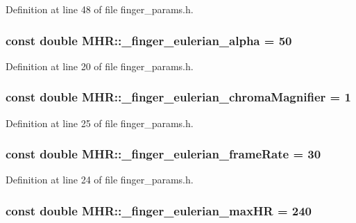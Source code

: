 Definition at line 48 of file finger\+\_\+params.\+h.

\hypertarget{namespace_m_h_r_abe389732cdfc0aa8ebf51a84c4e645a4}{
\subsubsection[{\+\_\+finger\+\_\+eulerian\+\_\+alpha}]{\setlength{\rightskip}{0pt plus 5cm}const double M\+H\+R\+::\+\_\+finger\+\_\+eulerian\+\_\+alpha = 50}}\label{namespace_m_h_r_abe389732cdfc0aa8ebf51a84c4e645a4}


Definition at line 20 of file finger\+\_\+params.\+h.

\hypertarget{namespace_m_h_r_adc0b183529468e1b7d2eec8275c004a6}{
\subsubsection[{\+\_\+finger\+\_\+eulerian\+\_\+chroma\+Magnifier}]{\setlength{\rightskip}{0pt plus 5cm}const double M\+H\+R\+::\+\_\+finger\+\_\+eulerian\+\_\+chroma\+Magnifier = 1}}\label{namespace_m_h_r_adc0b183529468e1b7d2eec8275c004a6}


Definition at line 25 of file finger\+\_\+params.\+h.

\hypertarget{namespace_m_h_r_a6a102813ef2ea5aa11cadcc9ebaa5bbc}{
\subsubsection[{\+\_\+finger\+\_\+eulerian\+\_\+frame\+Rate}]{\setlength{\rightskip}{0pt plus 5cm}const double M\+H\+R\+::\+\_\+finger\+\_\+eulerian\+\_\+frame\+Rate = 30}}\label{namespace_m_h_r_a6a102813ef2ea5aa11cadcc9ebaa5bbc}


Definition at line 24 of file finger\+\_\+params.\+h.

\hypertarget{namespace_m_h_r_ab2ef19fc7e685e8a85fbbbc75320fd6e}{
\subsubsection[{\+\_\+finger\+\_\+eulerian\+\_\+max\+H\+R}]{\setlength{\rightskip}{0pt plus 5cm}const double M\+H\+R\+::\+\_\+finger\+\_\+eulerian\+\_\+max\+H\+R = 240}}\label{namespace_m_h_r_ab2ef19fc7e685e8a85fbbbc75320fd6e}


